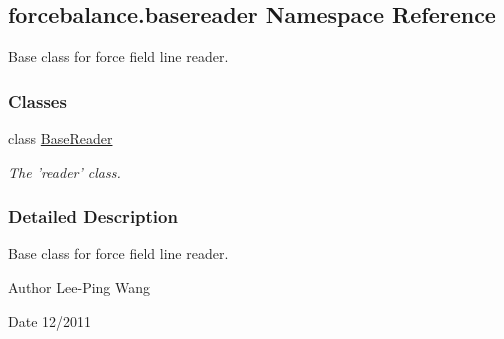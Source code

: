 \hypertarget{namespaceforcebalance_1_1basereader}{\subsection{forcebalance.\-basereader Namespace Reference}
\label{namespaceforcebalance_1_1basereader}
}


Base class for force field line reader.  


\subsubsection*{Classes}
\begin{DoxyCompactItemize}
\item 
class \hyperlink{classforcebalance_1_1basereader_1_1BaseReader}{Base\-Reader}
\begin{DoxyCompactList}\small\item\em The 'reader' class. \end{DoxyCompactList}\end{DoxyCompactItemize}


\subsubsection{Detailed Description}
Base class for force field line reader. \begin{DoxyAuthor}{Author}
Lee-\/\-Ping Wang 
\end{DoxyAuthor}
\begin{DoxyDate}{Date}
12/2011 
\end{DoxyDate}

